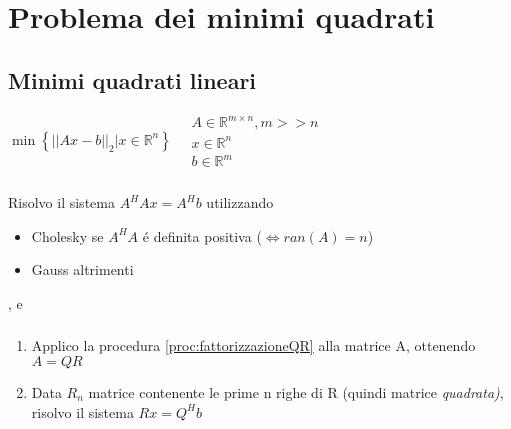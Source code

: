 \chapter{Problema dei minimi quadrati}
\section{Minimi quadrati lineari}
$ \min \left\lbrace || A x - b ||_2 | x \in \mathbb{R}^n \right\rbrace  \quad  \begin{array}{l}
A \in \mathbb{R}^{m \times n}, m >> n \\
x \in \mathbb{R}^n \\
b \in \mathbb{R}^m
\end{array} $

\subsection{}
\begin{proc}
Risolvo il sistema $ A^H A x = A^H b $ utilizzando
\begin{itemize}
\item Cholesky se $ A^H A $ \'e definita positiva ($ \Leftrightarrow ran(A) = n $)
\item Gauss altrimenti
\end{itemize}
\end{proc}

\askip

, e 

\subsection{}
\begin{proc}[Metodo QR]
\begin{enumerate}
\item Applico la procedura \ref{proc:fattorizzazioneQR} alla matrice A, ottenendo $ A = QR $
\item Data $ R_n $ matrice contenente le prime n righe di R (quindi matrice \emph{quadrata)}, risolvo il sistema $ Rx = Q^H b $
\end{enumerate}
\end{proc}

\askip



